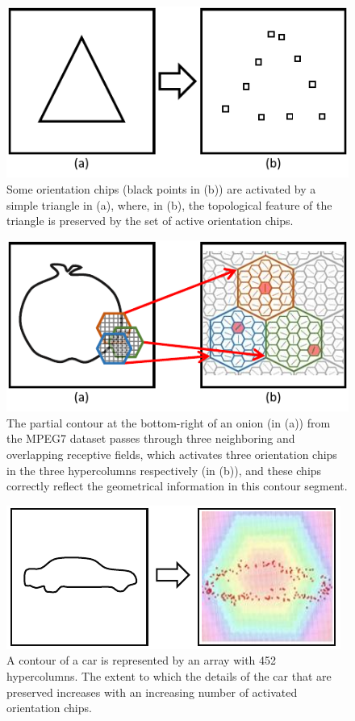 \documentclass[journal]{IEEEtran}
\begin{document}
\begin{figure}[!t]
\centering
\includegraphics[width=0.55\linewidth]{images/fig3.pdf}
\caption{Some orientation chips (black points in (b)) are activated by a simple triangle in (a), 
where, in (b), the topological feature of the triangle is preserved by the set of active orientation chips.}
\label{fig:3}
\end{figure}

\begin{figure}[!t]
\centering
\includegraphics[width=0.55\linewidth]{images/fig4.pdf}
\caption{The partial contour at the bottom-right of an onion (in (a)) from the MPEG7 dataset 
passes through three neighboring and overlapping receptive fields, 
which activates three orientation chips in the three hypercolumns respectively (in (b)), 
and these chips correctly reflect the geometrical information in this contour segment.}
\label{fig:4}
\end{figure}

\begin{figure}[!t]
\centering
\includegraphics[width=0.55\linewidth]{images/fig5.pdf}
\caption{A contour of a car is represented by an array with 452 hypercolumns. 
The extent to which the details of the car that are preserved increases 
with an increasing number of activated orientation chips.}
\label{fig:5}
\end{figure}
\end{document}
